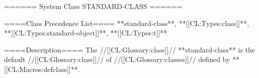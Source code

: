 ====== System Class STANDARD-CLASS ======

====Class Precedence List==== 
**standard-class**, **[[CL:Types:class]]**, **[[CL:Types:standard-object]]**, **[[CL:Types:t]]**

====Description====
The //[[CL:Glossary:class]]// **standard-class** is the default //[[CL:Glossary:class]]// of //[[CL:Glossary:classes]]// defined by **[[CL:Macros:defclass]]**.

